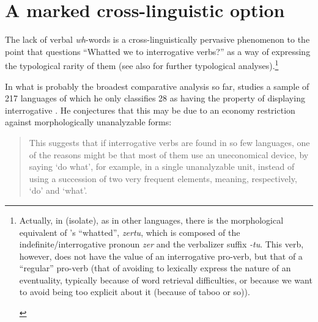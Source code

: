 \documentclass[output=paper]{langsci/langscibook}
\begin{document}
\section{A marked cross-linguistic option} \label{sec:2}

The lack of verbal \emph{wh}-words is a cross-linguistically pervasive
phenomenon to the point that \citet{hagege2003} questions ``Whatted we to
interrogative verbs?'' as a way of expressing the typological rarity of them
(see also \citealt{hagege2008,idiatov.vanderauwera2004} for further
typological analyses).\footnote{Actually, in  (isolate), as in other
    languages, there is the morphological equivalent of
    \citeauthor{hagege2003}'s \citeyearpar{hagege2003} ``whatted'',
    \emph{zertu}, which is composed of the indefinite/interrogative pronoun
    \emph{zer} and the verbalizer suffix \emph{-tu}. This verb, however,
    does not have the value of an interrogative pro-verb, but that of a
    ``regular'' pro-verb (that of avoiding to lexically express the nature of an
    eventuality, typically because of word retrieval difficulties, or because
    we want to avoid being too explicit about it (because of taboo or so)).

\label{fn:15.2}}

In what is probably the broadest comparative analysis so far,
\citet{hagege2008} studies a sample of 217 languages of which he only
classifies 28 as having the property of displaying interrogative . He
conjectures that this may be due to an economy restriction against
morphologically unanalyzable forms:

\begin{quote}This suggests that if interrogative verbs
are found in so few languages, one of the reasons might be that most of them
use an uneconomical device, by saying `do what’, for example, in a single
unanalyzable unit, instead of using a succession of two very frequent elements,
meaning, respectively, `do’ and `what’.\hfill \citep[30]{hagege2008}
\end{quote}
\end{document}
